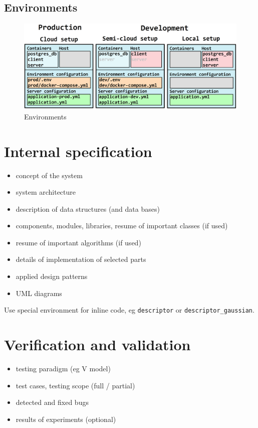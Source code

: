 \documentclass[a4paper,twoside,12pt]{book}
\begin{document}
\section{Environments}
\begin{figure}
  \centering
  \includegraphics[width=\linewidth]{img/environments.png}
  \caption{Environments}
  \label{fig:img:environments}
\end{figure}

\chapter{Internal specification}

\begin{itemize}
\item concept of the system
\item system architecture
\item description of data structures (and data bases)
\item components, modules, libraries, resume of important classes (if used)
\item resume of important algorithms (if used)
\item details of implementation of selected parts
\item applied design patterns
\item UML diagrams
\end{itemize}

Use special environment for inline code, eg \lstinline|descriptor| or \lstinline|descriptor_gaussian|.




\chapter{Verification and validation}
\begin{itemize}
\item testing paradigm (eg V model)
\item test cases, testing scope (full / partial)
\item detected and fixed bugs
\item results of experiments (optional)
\end{itemize}
\end{document}

